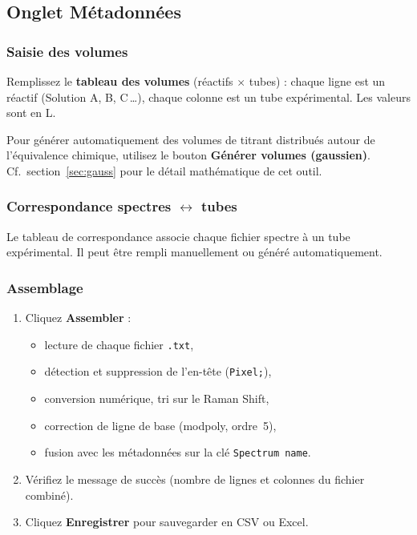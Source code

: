 \documentclass[12pt, a4paper]{article}
\begin{document}
\subsection{Onglet Métadonnées}

\subsubsection{Saisie des volumes}

Remplissez le \textbf{tableau des volumes} (réactifs $\times$ tubes) :
chaque ligne est un réactif (Solution A, B, C\,\ldots), chaque colonne est
un tube expérimental. Les valeurs sont en \textmu{}L.

Pour générer automatiquement des volumes de titrant distribués autour de
l'équivalence chimique, utilisez le bouton \textbf{Générer volumes (gaussien)}.
Cf.\ section~\ref{sec:gauss} pour le détail mathématique de cet outil.

\subsubsection{Correspondance spectres $\leftrightarrow$ tubes}

Le tableau de correspondance associe chaque fichier spectre à un tube
expérimental. Il peut être rempli manuellement ou généré automatiquement.

\subsubsection{Assemblage}

\begin{enumerate}
  \item Cliquez \textbf{Assembler} :
    \begin{itemize}
      \item lecture de chaque fichier \texttt{.txt},
      \item détection et suppression de l'en-tête (\texttt{Pixel;}),
      \item conversion numérique, tri sur le Raman Shift,
      \item correction de ligne de base (modpoly, ordre~5),
      \item fusion avec les métadonnées sur la clé \texttt{Spectrum name}.
    \end{itemize}
  \item Vérifiez le message de succès (nombre de lignes et colonnes du fichier
        combiné).
  \item Cliquez \textbf{Enregistrer} pour sauvegarder en CSV ou Excel.
\end{enumerate}
\end{document}

